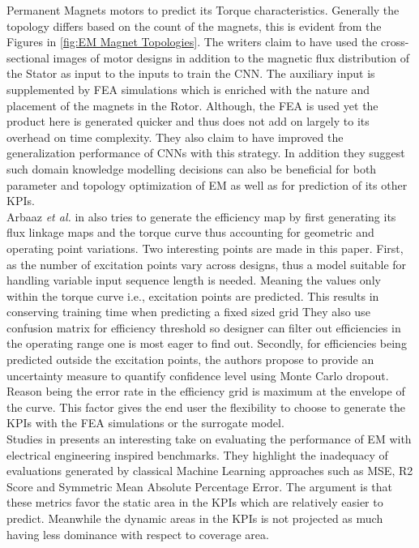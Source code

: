 \documentclass{report} %
\begin{document}
Permanent Magnets motors to predict its Torque characteristics.
Generally the topology differs based on the count of the magnets, this is evident from the Figures in \ref{fig:EM Magnet Topologies}.
The writers claim to have used the cross-sectional images of motor designs in addition to the magnetic flux distribution of the Stator as input to the
inputs to train the \ac{CNN}. The auxiliary input is supplemented by \ac{FEA} simulations which is enriched with the nature and placement of 
the magnets in the Rotor. Although, the \ac{FEA} is used yet the product here is generated quicker and thus does not add on largely to its overhead on time complexity. 
They also claim to have improved the generalization performance of \ac{CNN}s with this strategy. In addition they suggest such domain knowledge modelling decisions 
can also be beneficial for both parameter and topology optimization of \ac{EM} as well as for prediction of its other \ac{KPI}s.\\
Arbaaz \textit{et al.} in \cite{DL-ETA-2019} also tries to generate the efficiency map by first generating its flux linkage maps and the torque curve 
thus accounting for geometric and operating point variations. Two interesting points are made in this paper.
First, as the number of excitation points vary across designs, thus a model suitable for handling variable input sequence length is needed.
Meaning the values only within the torque curve i.e., excitation points are predicted. This results in conserving training time when predicting a fixed sized grid
They also use confusion matrix for efficiency threshold so designer can filter out efficiencies in the operating range one is most eager to find out.
Secondly, for efficiencies being predicted outside the excitation points, the authors propose to provide an uncertainty measure to quantify confidence level using Monte Carlo dropout.
Reason being the error rate in the efficiency grid is maximum at the envelope of the curve. This factor gives the end user 
the flexibility to choose to generate the \ac{KPI}s with the \ac{FEA} simulations or the surrogate model.\\
Studies in \cite{EM-PM-2020} presents an interesting take on evaluating the performance of \ac{EM} with electrical engineering inspired benchmarks.
They highlight the inadequacy of evaluations generated by classical Machine Learning approaches such as \ac{MSE}, R2 Score and Symmetric Mean Absolute Percentage Error.
The argument is that these metrics favor the static area in the \ac{KPI}s which are relatively easier to predict.
Meanwhile the dynamic areas in the \ac{KPI}s is not projected as much having less dominance with respect to coverage area.
\end{document}
